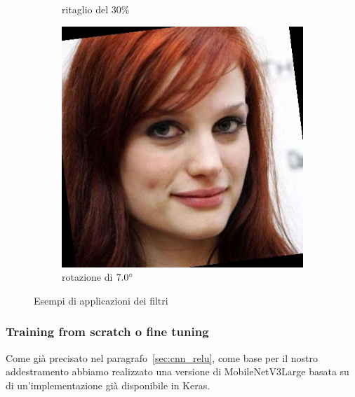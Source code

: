 \begin{figure}[ht]
\begin{subfigure}[t]{0.18\textwidth}
\caption{ritaglio del $30\%$}
\label{sfig:corruption_random_crop}
\end{subfigure}\hfill
\begin{subfigure}[t]{0.18\textwidth}
\includegraphics[width=\textwidth]{./Images/rotation_severity_7.0.jpg}
\caption{rotazione di $7.0 \degree$}
\label{sfig:corruption_rotation}
\end{subfigure}\hfill
\caption{Esempi di applicazioni dei filtri}
\label{sfig:data_augmentation}
\end{figure}

\subsubsection{Training from scratch o fine tuning}

Come già precisato nel paragrafo~\ref{sec:cnn_relu}, come base per il nostro addestramento abbiamo realizzato una versione di MobileNetV3Large basata su di un'implementazione già disponibile in Keras. 

